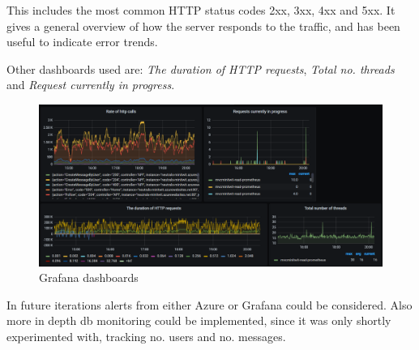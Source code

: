 \documentclass{article}
\begin{document}
This includes the most common HTTP status codes 2xx, 3xx, 4xx and 5xx. It gives a general overview of how the server responds to the traffic, and has been useful to indicate error trends.

Other dashboards used are: \textit{The duration of HTTP requests}, \textit{Total no. threads} and \textit{Request currently in progress}. 


\begin{figure}[H]
\centering
\includegraphics[width=1\textwidth]{images/dashboard.png}
\caption{\label{fig:dashboard} Grafana dashboards}
\end{figure}

In future iterations alerts from either Azure or Grafana could be considered. Also more in depth db monitoring could be implemented, since it was only shortly experimented with, tracking no. users and no. messages.
\end{document}
